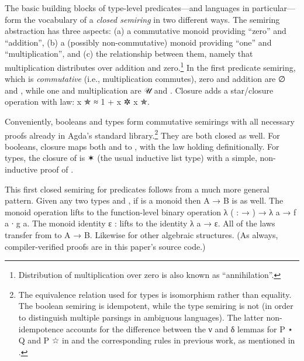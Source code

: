 \documentclass[acmsmall,screen,timestamp]{acmart}  %
\begin{document}


The basic building blocks of type-level predicates---and languages in particular---form the vocabulary of a \emph{closed semiring} in two different ways.
The semiring abstraction has three aspects: (a) a commutative monoid providing ``zero'' and ``addition'', (b) a (possibly non-commutative) monoid providing ``one'' and ``multiplication'', and (c) the relationship between them, namely that multiplication distributes over addition and zero.\footnote{Distribution of multiplication over zero is also known as ``annihilation''.}
In the first predicate semiring, which is \emph{commutative} (i.e., multiplication commutes), zero and addition are \AF ∅ and , while one and multiplication are \AF 𝒰 and .
Closure adds a star/closure operation  with  law: {\AB x \AF ✯ \AF ≈ 1 \AF + \AB x \AF ✲ \AB x \AF ✯}.

Conveniently, booleans and types form commutative semirings with all necessary proofs already in Agda's standard library.\footnote{The equivalence relation used for types is isomorphism rather than equality.
The boolean semiring is idempotent, while the type semiring is not (in order to distinguish multiple parsings in ambiguous languages).
The latter non-idempotence accounts for the difference between the \AF ν and \AF δ lemmas for {\AB P ⋆ \AB Q} and {\AB P ☆} in  and the corresponding rules in previous work, as mentioned in .}
They are both closed as well.
For booleans, closure maps both  and  to , with the  law holding definitionally.
For types, the closure of  is { ✶} (the usual inductive list type) with a simple, non-inductive proof of .

This first closed semiring for predicates follows from a much more general pattern.
Given any two types  and , if  is a monoid then {\AB A \AS → \AB B} is as well.
The monoid operation  lifts to the function-level binary operation {\AS λ (  :  \AS → ) \AS → \AS λ \AB a \AS → \AB f \AB a \AB ∙ \AB g \AB a}.
The monoid identity {\AB ε \AS : } lifts to the identity {\AS λ \AB a \AS → \AB ε}.
All of the laws transfer from  to {\AB A \AS → \AB B}.
Likewise for other algebraic structures.
(As always, compiler-verified proofs are in this paper's source code.)
\end{document}
